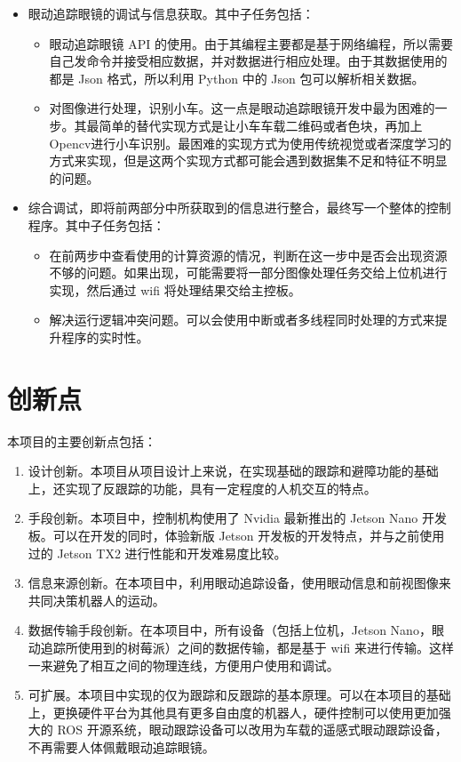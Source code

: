 \documentclass{article}
\begin{document}
\begin{spacing}{1.5}
\begin{itemize}
    \item 眼动追踪眼镜的调试与信息获取。其中子任务包括：
    \begin{itemize}
        \item 眼动追踪眼镜 API 的使用。由于其编程主要都是基于网络编程，所以需要自己发命令并接受相应数据，并对数据进行相应处理。由于其数据使用的都是 Json 格式，所以利用 Python 中的 Json 包可以解析相关数据。
        \item 对图像进行处理，识别小车。这一点是眼动追踪眼镜开发中最为困难的一步。其最简单的替代实现方式是让小车车载二维码或者色块，再加上Opencv进行小车识别。最困难的实现方式为使用传统视觉或者深度学习的方式来实现，但是这两个实现方式都可能会遇到数据集不足和特征不明显的问题。
    \end{itemize}

    \item 综合调试，即将前两部分中所获取到的信息进行整合，最终写一个整体的控制程序。其中子任务包括：
    \begin{itemize}
        \item 在前两步中查看使用的计算资源的情况，判断在这一步中是否会出现资源不够的问题。如果出现，可能需要将一部分图像处理任务交给上位机进行实现，然后通过 wifi 将处理结果交给主控板。
        \item 解决运行逻辑冲突问题。可以会使用中断或者多线程同时处理的方式来提升程序的实时性。
    \end{itemize}
\end{itemize}

\section{创新点}

本项目的主要创新点包括：

\begin{enumerate}
    \item 设计创新。本项目从项目设计上来说，在实现基础的跟踪和避障功能的基础上，还实现了反跟踪的功能，具有一定程度的人机交互的特点。
    \item 手段创新。本项目中，控制机构使用了 Nvidia 最新推出的 Jetson Nano 开发板。可以在开发的同时，体验新版 Jetson 开发板的开发特点，并与之前使用过的 Jetson TX2 进行性能和开发难易度比较。
    \item 信息来源创新。在本项目中，利用眼动追踪设备，使用眼动信息和前视图像来共同决策机器人的运动。
    \item 数据传输手段创新。在本项目中，所有设备（包括上位机，Jetson Nano，眼动追踪所使用到的树莓派）之间的数据传输，都是基于 wifi 来进行传输。这样一来避免了相互之间的物理连线，方便用户使用和调试。
    \item 可扩展。本项目中实现的仅为跟踪和反跟踪的基本原理。可以在本项目的基础上，更换硬件平台为其他具有更多自由度的机器人，硬件控制可以使用更加强大的 ROS 开源系统，眼动跟踪设备可以改用为车载的遥感式眼动跟踪设备，不再需要人体佩戴眼动追踪眼镜。
\end{enumerate}


\end{spacing}
\end{document}
